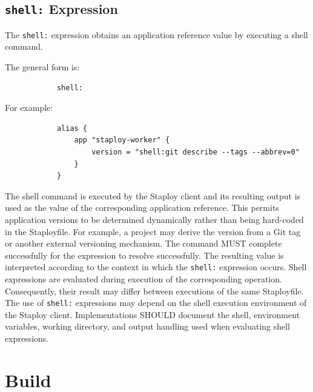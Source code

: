 \documentclass[11pt,a4paper]{article}
\begin{document}
    \subsection{\texttt{shell:} Expression}\label{subsec:texttt-shell-expression}

    The \texttt{shell:} expression obtains an application reference value by executing a shell command.

    The general form is:

    \begin{center}
        \begin{verbatim}
            shell:
        \end{verbatim}
    \end{center}

    For example:

    \begin{center}
        \begin{verbatim}
            alias {
                app "staploy-worker" {
                    version = "shell:git describe --tags --abbrev=0"
                }
            }
        \end{verbatim}
    \end{center}

    The shell command is executed by the Staploy client and its resulting output is used as the value of the corresponding application reference.
    This permits application versions to be determined dynamically rather than being hard-coded in the Staployfile.
    For example, a project may derive the version from a Git tag or another external versioning mechanism.
    The command MUST complete successfully for the expression to resolve successfully.
    The resulting value is interpreted according to the context in which the \texttt{shell:} expression occurs.
    Shell expressions are evaluated during execution of the corresponding operation.
    Consequently, their result may differ between executions of the same Staployfile.
    The use of \texttt{shell:} expressions may depend on the shell execution environment of the Staploy client.
    Implementations SHOULD document the shell, environment variables, working directory, and output handling used when evaluating shell expressions.


    \section{Build}\label{sec:build}
\end{document}
